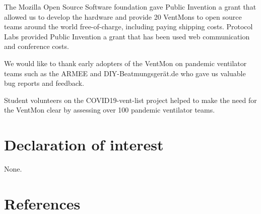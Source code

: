 \documentclass[11pt, letterpaper]{article}
\begin{document}
The Mozilla Open Source Software foundation gave Public Invention a grant that allowed us to develop the hardware and
provide 20 VentMons to open source teams around the world free-of-charge, including paying shipping costs.
Protocol Labs provided Public Invention a grant that has been used web communication and conference costs.

We would like to thank early adopters of the VentMon on pandemic ventilator teams such as the ARMEE\cite{} and
DIY-Beatmungsgerät.de\cite{}
who gave us valuable bug reports and feedback.

Student volunteers on the COVID19-vent-list project\cite{} helped to make the need for the VentMon clear by assessing over 100
pandemic ventilator teams.

\section{Declaration of interest}

None.




\iffalse

\section*{References}
\end{document}
